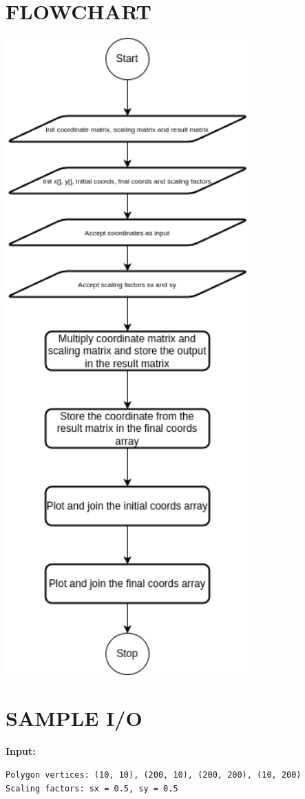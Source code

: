 \documentclass{article}
\begin{document}
\section*{FLOWCHART}
\begin{center}
\includegraphics[width=0.7\textwidth]{flowchart.png}
\end{center}

\section*{SAMPLE I/O}
\textbf{Input:}
\begin{verbatim}
Polygon vertices: (10, 10), (200, 10), (200, 200), (10, 200)
Scaling factors: sx = 0.5, sy = 0.5
\end{verbatim}
\end{document}
